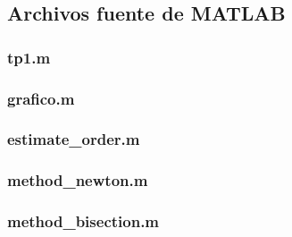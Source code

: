 \lstset{numbersep=5pt}

\lstset{inputencoding=cp1252}



\fontsize{9pt}{10pt}
\selectfont







\subsection{Archivos fuente de \textbf{MATLAB}}
\label{apendix:files}
\subsubsection{tp1.m}
\label{apendix:file_tp1}

\clearpage

\subsubsection{grafico.m}
\label{apendix:file_grafico}

\clearpage

\subsubsection{estimate\_order.m}
\label{apendix:file_estimate_order}

\clearpage

\subsubsection{method\_newton.m}
\label{apendix:file_method_newton}

\clearpage

\subsubsection{method\_bisection.m}
\label{apendix:file_method_regulafalsi}

\clearpage


\normalfont
\normalsize







